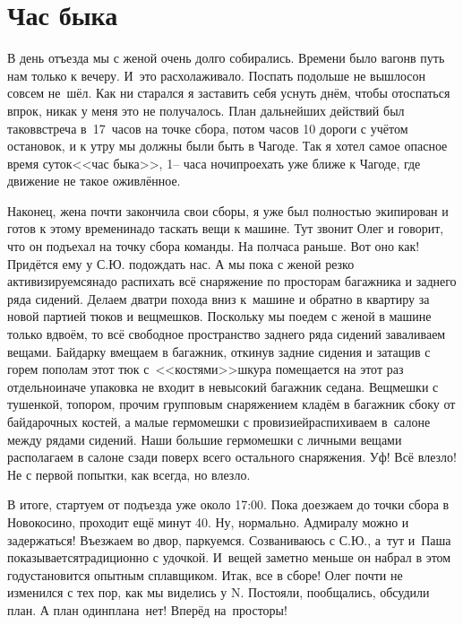 \chapter{Час быка} 
\vepsianrose

В день отъезда мы с женой очень долго собирались. Времени было вагон\mdash в путь нам только к вечеру. И~это расхолаживало. Поспать подольше не вышло\mdash сон совсем не~шёл. Как ни старался я заставить себя уснуть днём, чтобы отоспаться впрок, никак у меня это не получалось. План дальнейших действий был таков\mdash встреча в~17~часов на точке сбора, потом часов 10 дороги с учётом остановок, и к утру мы должны были быть в Чагоде. Так я хотел самое опасное время суток\mdash <<час быка>>, 1\thinspace\nobreakdash-- часа ночи\mdash проехать уже ближе к Чагоде, где движение не такое оживлённое. 

Наконец, жена почти закончила свои сборы, я уже был полностью экипирован и готов к этому времени\mdash надо таскать вещи к машине. Тут звонит Олег и говорит, что он подъехал на точку сбора команды. На полчаса раньше. Вот оно как! Придётся ему у С.Ю. подождать нас. А мы пока с женой резко активизируемся\mdash надо распихать всё снаряжение по просторам багажника и заднего ряда сидений. Делаем два\sdash три похода вниз к~машине и обратно в квартиру за новой партией тюков и вещмешков. Поскольку мы поедем с женой в машине только вдвоём, то всё свободное пространство заднего ряда сидений заваливаем вещами. Байдарку вмещаем в багажник, откинув задние сидения и затащив с горем пополам этот тюк с~<<костями>>\mdash шкура помещается на этот раз отдельно\mdash иначе упаковка не входит в невысокий багажник седана. Вещмешки с тушенкой, топором, прочим групповым снаряжением кладём в багажник сбоку от байдарочных костей, а малые гермомешки с провизией\mdash распихиваем в~салоне между рядами сидений. Наши большие гермомешки с личными вещами располагаем в салоне сзади поверх всего остального снаряжения. Уф! Всё влезло! Не с первой попытки, как всегда, но влезло. 

В итоге, стартуем от подъезда уже около 17:00. Пока доезжаем до точки сбора в Новокосино, проходит ещё минут 40. Ну, нормально. Адмиралу можно и задержаться! Въезжаем во двор, паркуемся. Созваниваюсь с С.Ю., а~тут и~Паша показывается\mdash традиционно с удочкой. И~вещей заметно меньше он набрал в этом году\mdash становится опытным сплавщиком. Итак, все в сборе! Олег почти не изменился с тех пор, как мы виделись у N. Постояли, пообщались, обсудили план. А план один\mdash плана~нет! Вперёд на~просторы! 

